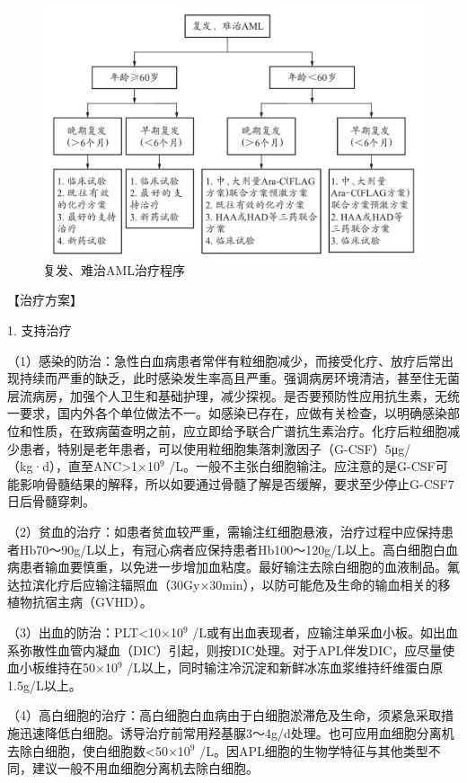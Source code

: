 \begin{figure}[!htbp]
 \centering
 \includegraphics{./images/Image00144.jpg}
 \captionsetup{justification=centering}
 \caption{复发、难治AML治疗程序}
 \label{fig5-1-11}
  \end{figure} 

【治疗方案】

1. 支持治疗

（1）感染的防治：急性白血病患者常伴有粒细胞减少，而接受化疗、放疗后常出现持续而严重的缺乏，此时感染发生率高且严重。强调病房环境清洁，甚至住无菌层流病房，加强个人卫生和基础护理，减少探视。是否要预防性应用抗生素，无统一要求，国内外各个单位做法不一。如感染已存在，应做有关检查，以明确感染部位和性质，在致病菌查明之前，应立即给予联合广谱抗生素治疗。化疗后粒细胞减少患者，特别是老年患者，可以使用粒细胞集落刺激因子（G-CSF）5μg/（kg·d），直至ANC\textgreater{}1×10$^{9}$
/L。一般不主张白细胞输注。应注意的是G-CSF可能影响骨髓结果的解释，所以如要通过骨髓了解是否缓解，要求至少停止G-CSF7日后骨髓穿刺。

（2）贫血的治疗：如患者贫血较严重，需输注红细胞悬液，治疗过程中应保持患者Hb70～90g/L以上，有冠心病者应保持患者Hb100～120g/L以上。高白细胞白血病患者输血要慎重，以免进一步增加血粘度。最好输注去除白细胞的血液制品。氟达拉滨化疗后应输注辐照血（30Gy×30min），以防可能危及生命的输血相关的移植物抗宿主病（GVHD）。

（3）出血的防治：PLT<10×10$^{9}$
/L或有出血表现者，应输注单采血小板。如出血系弥散性血管内凝血（DIC）引起，则按DIC处理。对于APL伴发DIC，应尽量使血小板维持在50×10$^{9}$
/L以上，同时输注冷沉淀和新鲜冰冻血浆维持纤维蛋白原1.5g/L以上。

（4）高白细胞的治疗：高白细胞白血病由于白细胞淤滞危及生命，须紧急采取措施迅速降低白细胞。诱导治疗前常用羟基脲3～4g/d处理。也可应用血细胞分离机去除白细胞，使白细胞数<50×10$^{9}$
/L。因APL细胞的生物学特征与其他类型不同，建议一般不用血细胞分离机去除白细胞。

